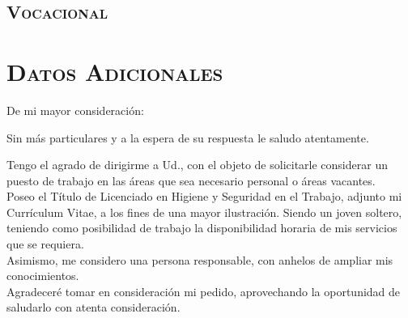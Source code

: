 \documentclass[11pt,a4paper]{moderncv}
\begin{document}
\subsection{\textsc{Vocacional}}






\section{\textsc{Datos Adicionales}}



%


\clearpage

\date{}
\opening{De mi mayor consideración:}
\closing{Sin más particulares y a la espera de su respuesta le saludo atentamente.}
\makelettertitle

Tengo el agrado de dirigirme a Ud., con el objeto de solicitarle considerar un puesto de trabajo en las áreas que sea necesario personal o áreas vacantes.\\
Poseo el Título de Licenciado en Higiene y Seguridad en el Trabajo, adjunto mi Currículum Vitae, a los fines de una mayor ilustración. Siendo un joven soltero, teniendo como posibilidad de trabajo la disponibilidad horaria de mis servicios que se requiera.\\
Asimismo, me considero una persona responsable, con anhelos de ampliar mis conocimientos.\\
Agradeceré tomar en consideración mi pedido, aprovechando la oportunidad de saludarlo con atenta consideración.



\makeletterclosing
\end{document}
